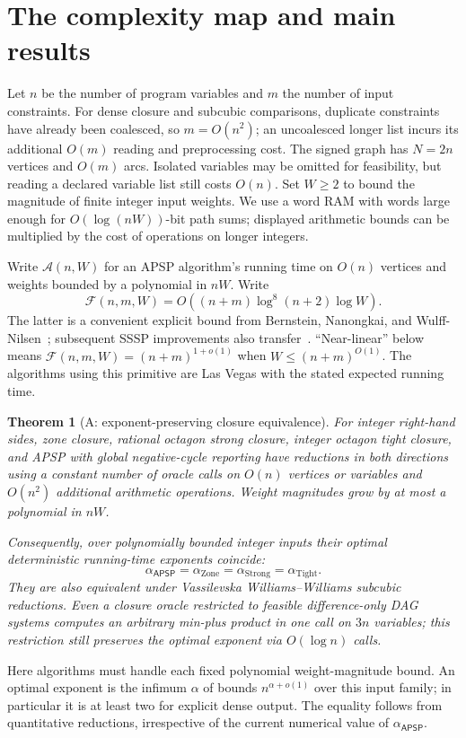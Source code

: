 \documentclass[manuscript,11pt,screen,nonacm]{acmart}
\newtheorem{theorem}{Theorem}[section]
\theoremstyle{definition}
\newcommand{\AP}{\mathsf{APSP}}
\newcommand{\Ftime}{\mathcal F(n,m,W)}
\newcommand{\Atime}{\mathcal A(n,W)}
\begin{document}
\section{The complexity map and main results}\label{sec:results}
Let $n$ be the number of program variables and $m$ the number of input constraints. For dense closure and subcubic comparisons, duplicate constraints have already been coalesced, so $m=O(n^2)$; an uncoalesced longer list incurs its additional $O(m)$ reading and preprocessing cost. The signed graph has $N=2n$ vertices and $O(m)$ arcs. Isolated variables may be omitted for feasibility, but reading a declared variable list still costs $O(n)$. Set $W\geq2$ to bound the magnitude of finite integer input weights. We use a word RAM with words large enough for $O(\log(nW))$-bit path sums; displayed arithmetic bounds can be multiplied by the cost of operations on longer integers.

Write $\Atime$ for an APSP algorithm's running time on $O(n)$ vertices and weights bounded by a polynomial in $nW$. Write
\[
 \Ftime=O((n+m)\log^8(n+2)\log W).
\]
The latter is a convenient explicit bound from Bernstein, Nanongkai, and Wulff-Nilsen~\cite{bnw2022}; subsequent SSSP improvements also transfer~\cite{bcf2023}. ``Near-linear'' below means $\Ftime=(n+m)^{1+o(1)}$ when $W\leq(n+m)^{O(1)}$. The algorithms using this primitive are Las Vegas with the stated expected running time.

\begin{theorem}[A: exponent-preserving closure equivalence]\label{thm:A}
For integer right-hand sides, zone closure, rational octagon strong closure, integer octagon tight closure, and APSP with global negative-cycle reporting have reductions in both directions using a constant number of oracle calls on $O(n)$ vertices or variables and $O(n^2)$ additional arithmetic operations. Weight magnitudes grow by at most a polynomial in $nW$.

Consequently, over polynomially bounded integer inputs their optimal deterministic running-time exponents coincide:
\[
 \alpha_{\AP}=\alpha_{\mathrm{Zone}}=\alpha_{\mathrm{Strong}}=\alpha_{\mathrm{Tight}}.
\]
They are also equivalent under Vassilevska Williams--Williams subcubic reductions. Even a closure oracle restricted to feasible difference-only DAG systems computes an arbitrary min-plus product in one call on $3n$ variables; this restriction still preserves the optimal exponent via $O(\log n)$ calls.
\end{theorem}
Here algorithms must handle each fixed polynomial weight-magnitude bound. An optimal exponent is the infimum $\alpha$ of bounds $n^{\alpha+o(1)}$ over this input family; in particular it is at least two for explicit dense output. The equality follows from quantitative reductions, irrespective of the current numerical value of $\alpha_{\AP}$.
\end{document}
